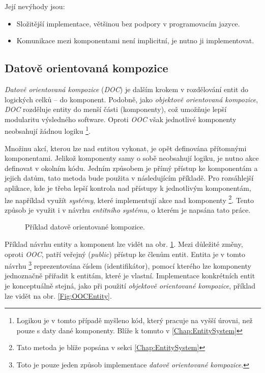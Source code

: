 \noindent Její nevýhody jsou: 
\begin{itemize}
	\item Složitější implementace, většinou bez podpory v programovacím jazyce.
	\item Komunikace mezi komponentami není implicitní, je nutno ji implementovat. 
\end{itemize}

\subsection{Datově orientovaná kompozice}
\label{Chap:DOC}

\emph{Datově orientovaná kompozice} (\emph{DOC}) je dalším krokem v rozdělování entit do logických celků -- do komponent. Podobně, jako \emph{objektově orientovaná kompozice}, \emph{DOC} rozděluje entity do menší části (komponenty), což umožňuje lepší modularitu výsledného software. Oproti \emph{OOC} však jednotlivé komponenty neobsahují žádnou logiku \footnote{Logikou je v tomto případě myšleno kód, který pracuje na vyšší úrovni, než pouze s daty dané komponenty. Blíže k tomuto v \ref{Chap:EntitySystem}}.

Množinu akcí, kterou lze nad entitou vykonat, je opět definována přítomnými komponentami. Jelikož komponenty samy o sobě neobsahují logiku, je nutno akce definovat v okolním kódu. Jedním způsobem je přímý přístup ke komponentám a jejich datům, tato metoda bude použita v následujícím příkladě. Pro rozsáhlejší aplikace, kde je třeba lepší kontrola nad přístupy k jednotlivým komponentám, lze například využít \emph{systémy}, které implementují akce nad komponenty \footnote{Tato metoda je blíže popsána v sekci \ref{Chap:EntitySystem}}. Tento způsob je využit i v návrhu \emph{entitního systému}, o kterém je napsána tato práce.

\begin{figure}
	\caption{Příklad datově orientované kompozice.}
	\label{Fig:DOCHierarchy}
\end{figure}

Příklad návrhu entity a komponent lze vidět na obr. \ref{Fig:DOCHierarchy}. Mezi důležité změny, oproti \emph{OOC}, patří veřejný (\emph{public}) přístup ke členům entit. Entita je v tomto návrhu \footnote{Toto je pouze jeden způsob implementace \emph{datově orientované kompozice}.} reprezentována číslem (identifikátor), pomocí kterého lze komponenty jednoznačně přiřadit k entitám, které je vlastní. Implementace konkrétních entit je konceptuálně stejná, jako při použití \emph{objektově orientované kompozice}, příklad lze vidět na obr. \ref{Fig:OOCEntity}.

